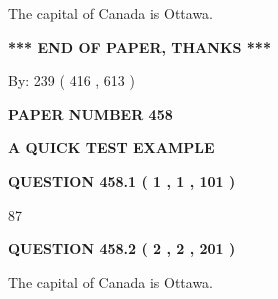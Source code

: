 \documentclass[12pt]{article}
\begin{document}
  
 
 
\noindent{}
 
 
The capital of Canada is Ottawa.
 
 
 
 
   
   
 \vspace{0.2in}
 
   
   
   
   
\vspace{1.0in} 
{\textbf{\large{ *** END OF PAPER, THANKS *** }}} 
   
   
\hspace{1.0in} By: 
 239 ( 416 ,  613 )
   
   
   
   
\newpage 
\setcounter{page}{ 
   458001 } 
   
   
   
   
 {\textbf{ \Large{ PAPER NUMBER  458  }}}
   
   
\vspace{0.2in}
   
   
   
   
   
   
 \vspace{0.2in}
{\LARGE {\textbf{ A QUICK TEST EXAMPLE}}}
   
   
  
\vspace{0.2in}
  
{\textbf{\Large{QUESTION
458.1 
 ( 1 , 1 , 101 )
}}}
  
  
 
 
\noindent{}

87
 
 
  
\vspace{0.2in}
  
{\textbf{\Large{QUESTION
458.2 
 ( 2 , 2 , 201 )
}}}
  
  
 
 
\noindent{}
 
 
The capital of Canada is Ottawa.
 
\end{document}

